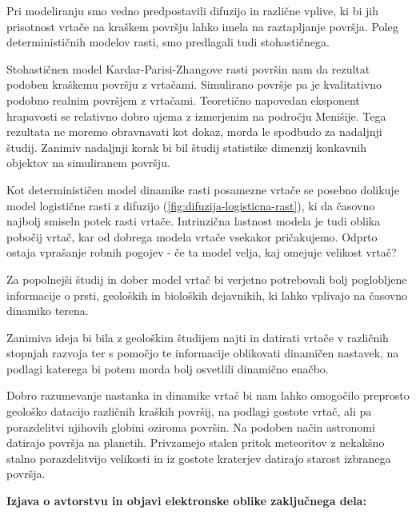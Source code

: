 \documentclass[a4paper, twoside, 12pt]{book}
\begin{document}
    Pri modeliranju smo vedno predpostavili difuzijo in različne vplive, ki bi jih prisotnost vrtače na kraškem površju lahko imela na raztapljanje površja. Poleg determinističnih modelov rasti, smo predlagali tudi stohastičnega.

    Stohastičnen model Kardar-Parisi-Zhangove rasti površin nam da rezultat podoben kraškemu površju z vrtačami. Simulirano površje pa je kvalitativno podobno realnim površjem z vrtačami. Teoretično napovedan eksponent hrapavosti se relativno dobro ujema z izmerjenim na področju Menišije. Tega rezultata ne moremo obravnavati kot dokaz, morda le spodbudo za nadaljnji študij. Zanimiv nadaljnji korak bi bil študij statistike dimenzij konkavnih objektov na simuliranem površju.

    Kot determinističen model dinamike rasti posamezne vrtače se posebno dolikuje model logistične rasti z difuzijo (\ref{fig:difuzija-logisticna-rast}), ki da časovno najbolj smiseln potek rasti vrtače. Intrinzična lastnost modela je tudi oblika pobočij vrtač, kar od dobrega modela vrtače vsekakor pričakujemo. Odprto ostaja vprašanje robnih pogojev - če ta model velja, kaj omejuje velikost vrtač?

    Za popolnejši študij in dober model vrtač bi verjetno potrebovali bolj poglobljene informacije o prsti, geoloških in bioloških dejavnikih, ki lahko vplivajo na časovno dinamiko terena.

Zanimiva ideja bi bila z geološkim študijem najti in datirati vrtače v različnih stopnjah razvoja ter s pomočjo te informacije oblikovati dinamičen nastavek, na podlagi katerega bi potem morda bolj osvetlili dinamično enačbo.

Dobro razumevanje nastanka in dinamike vrtač bi nam lahko omogočilo preprosto geološko datacijo različnih kraških površij, na podlagi gostote vrtač, ali pa porazdelitvi njihovih globini oziroma površin. Na podoben način astronomi datirajo površja na planetih. Privzamejo stalen pritok meteoritov z nekakšno stalno porazdelitvijo velikosti in iz gostote kraterjev datirajo starost izbranega površja. \cite{trey2011size}

    \newpage \thispagestyle{empty}


    \nocite{*}
    \newpage
    {}
    

    \newpage \thispagestyle{empty}



    \vspace*{1cm}
    \begin{center} {\Large \textbf{\sc Izjava o avtorstvu in objavi elektronske oblike zaključnega dela: }} \end{center}
\end{document}
